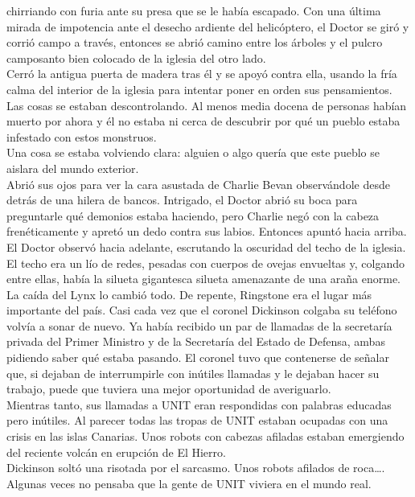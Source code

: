 chirriando con furia ante su presa que se le había escapado. Con una
última mirada de impotencia ante el desecho ardiente del helicóptero, el
Doctor se giró y corrió campo a través, entonces se abrió camino entre
los árboles y el pulcro camposanto bien colocado de la iglesia del otro
lado.\\
Cerró la antigua puerta de madera tras él y se apoyó contra ella, usando
la fría calma del interior de la iglesia para intentar poner en orden
sus pensamientos. Las cosas se estaban descontrolando. Al menos media
docena de personas habían muerto por ahora y él no estaba ni cerca de
descubrir por qué un pueblo estaba infestado con estos monstruos.\\
Una cosa se estaba volviendo clara: alguien o algo quería que este
pueblo se aislara del mundo exterior.\\
Abrió sus ojos para ver la cara asustada de Charlie Bevan observándole
desde detrás de una hilera de bancos. Intrigado, el Doctor abrió su boca
para preguntarle qué demonios estaba haciendo, pero Charlie negó con la
cabeza frenéticamente y apretó un dedo contra sus labios. Entonces
apuntó hacia arriba.\\
El Doctor observó hacia adelante, escrutando la oscuridad del techo de
la iglesia. El techo era un lío de redes, pesadas con cuerpos de ovejas
envueltas y, colgando entre ellas, había la silueta gigantesca silueta
amenazante de una araña enorme.\\[2\baselineskip]La caída del Lynx lo
cambió todo. De repente, Ringstone era el lugar más importante del país.
Casi cada vez que el coronel Dickinson colgaba su teléfono volvía a
sonar de nuevo. Ya había recibido un par de llamadas de la secretaría
privada del Primer Ministro y de la Secretaría del Estado de Defensa,
ambas pidiendo saber qué estaba pasando. El coronel tuvo que contenerse
de señalar que, si dejaban de interrumpirle con inútiles llamadas y le
dejaban hacer su trabajo, puede que tuviera una mejor oportunidad de
averiguarlo.\\
Mientras tanto, sus llamadas a UNIT eran respondidas con palabras
educadas pero inútiles. Al parecer todas las tropas de UNIT estaban
ocupadas con una crisis en las islas Canarias. Unos robots con cabezas
afiladas estaban emergiendo del reciente volcán en erupción de El
Hierro.\\
Dickinson soltó una risotada por el sarcasmo. Unos robots afilados de
roca\ldots{}. Algunas veces no pensaba que la gente de UNIT viviera en
el mundo real.\\
